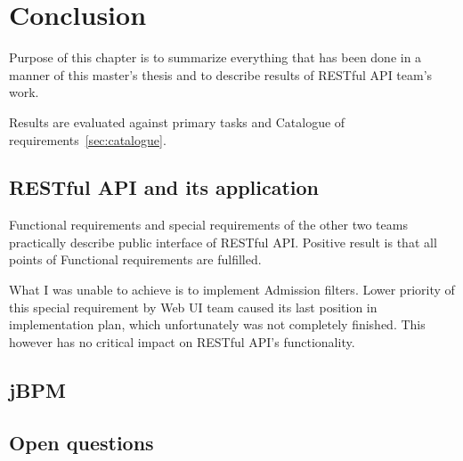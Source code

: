 \chapter{Conclusion}\label{cha:conclusion}

	Purpose of this chapter is to summarize everything that has been done in a manner of this master's thesis and to
	describe results of RESTful API team's work.
	
	Results are evaluated against primary tasks and Catalogue of requirements~\ref{sec:catalogue}.
	
	\section{RESTful API and its application}
	
	Functional requirements and special requirements of the other two teams practically describe public interface of
	RESTful API.
	Positive result is that all points of Functional requirements are fulfilled.
	
	What I was unable to achieve is to implement Admission filters. Lower priority of this special requirement by Web UI
	team caused its last position in implementation plan, which unfortunately was not completely finished. This however has
	no critical impact on RESTful API's functionality.
	
	\section{jBPM}
	
	\section{Open questions}
